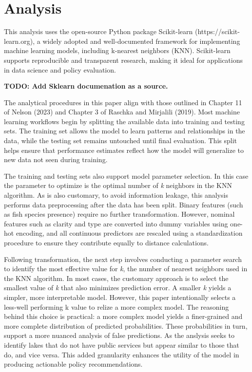 \documentclass[
]{article}
\begin{document}
\section{Analysis}\label{analysis}

This analysis uses the open-source Python package Scikit-learn
(https://scikit-learn.org), a widely adopted and well-documented
framework for implementing machine learning models, including k-nearest
neighbors (KNN). Scikit-learn supports reproducible and transparent
research, making it ideal for applications in data science and policy
evaluation.

\textbf{TODO: Add Sklearn documenation as a source.}

The analytical procedures in this paper align with those outlined in
Chapter 11 of Nelson (2023) and Chapter 3 of Raschka and Mirjalili
(2019). Most machine learning workflows begin by splitting the available
data into training and testing sets. The training set allows the model
to learn patterns and relationships in the data, while the testing set
remains untouched until final evaluation. This split helps ensure that
performance estimates reflect how the model will generalize to new data
not seen during training.

The training and testing sets also support model parameter selection. In
this case the parameter to optimize is the optimal number of \emph{k}
neighbors in the KNN algorithm. As is also customary, to avoid
information leakage, this analysis performs data preprocessing after the
data has been split. Binary features (such as fish species presence)
require no further transformation. However, nominal features such as
clarity and type are converted into dummy variables using one-hot
encoding, and all continuous predictors are rescaled using a
standardization procedure to ensure they contribute equally to distance
calculations.

Following transformation, the next step involves conducting a parameter
search to identify the most effective value for \emph{k}, the number of
nearest neighbors used in the KNN algorithm. In most cases, the
customary approach is to select the smallest value of \emph{k} that also
minimizes prediction error. A smaller \emph{k} yields a simpler, more
interpretable model. However, this paper intentionally selects a
less-well performing k value to relize a more complex model. The
reasoning behind this choice is practical: a more complex model yields a
finer-grained and more complete distribution of predicted probabilities.
These probabilities in turn, support a more nuanced analysis of false
predictions. As the anslysis seeks to identify lakes that do not have
public services but appear similar to those that do, and vice versa.
This added granularity enhances the utility of the model in producing
actionable policy recommendations.
\end{document}
